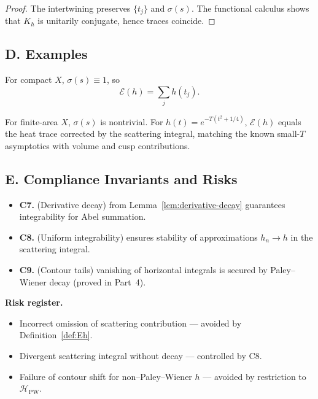 \begin{proof}
The intertwining preserves $\{t_j\}$ and $\sigma(s)$. The functional calculus shows that $K_h$ is unitarily conjugate, hence traces coincide.
\end{proof}

\subsection*{D. Examples}
\label{subsec:examples-Eh}

\begin{example}
For compact $X$, $\sigma(s)\equiv 1$, so
\[
  \mathcal E(h)=\sum_{j} h(t_j).
\]
\end{example}

\begin{example}
For finite-area $X$, $\sigma(s)$ is nontrivial. For $h(t)=e^{-T(t^2+1/4)}$, $\mathcal E(h)$ equals the heat trace corrected by the scattering integral, matching the known small-$T$ asymptotics with volume and cusp contributions.
\end{example}

\subsection*{E. Compliance Invariants and Risks}
\label{subsec:invariants-part3}

\begin{itemize}
  \item \textbf{C7.} (Derivative decay) from Lemma~\ref{lem:derivative-decay} guarantees integrability for Abel summation.
  \item \textbf{C8.} (Uniform integrability) ensures stability of approximations $h_n\to h$ in the scattering integral.
  \item \textbf{C9.} (Contour tails) vanishing of horizontal integrals is secured by Paley–Wiener decay (proved in Part~4).
\end{itemize}

\noindent\textbf{Risk register.}
\begin{itemize}
  \item Incorrect omission of scattering contribution — avoided by Definition~\ref{def:Eh}.
  \item Divergent scattering integral without decay — controlled by C8.
  \item Failure of contour shift for non–Paley–Wiener $h$ — avoided by restriction to $\mathcal H_{\mathrm{PW}}$.
\end{itemize}

